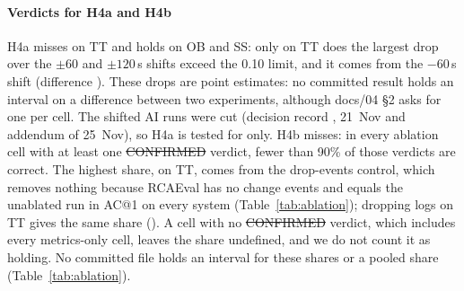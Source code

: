 \paragraph{Verdicts for H4a and H4b}
H4a misses on TT and holds on OB and SS: only on TT does the largest drop over the $\pm 60$ and $\pm 120$\,s shifts exceed the 0.10 limit, and it comes from the $-60$\,s shift (difference ).
These drops are point estimates: no committed result holds an interval on a difference between two experiments, although docs/04 §2 asks for one per cell.
The shifted AI runs were cut (decision record \allowbreak{}, 21~Nov and addendum of 25~Nov), so H4a is tested for  only.
H4b misses: in every ablation cell with at least one \st{CONFIRMED} verdict, fewer than 90\% of those verdicts are correct.
The highest share,  on TT, comes from the drop-events control, which removes nothing because RCAEval has no change events and equals the unablated run in AC@1 on every system (Table~\ref{tab:ablation}); dropping logs on TT gives the same share ().
A cell with no \st{CONFIRMED} verdict, which includes every metrics-only cell, leaves the share undefined, and we do not count it as holding.
No committed file holds an interval for these shares or a pooled share (Table~\ref{tab:ablation}).

